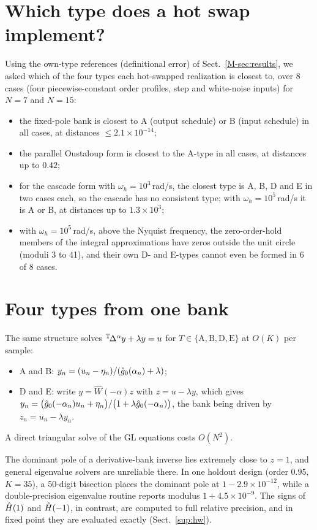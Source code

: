 \section{Which type does a hot swap implement?}\label{sup:hotswap}
Using the own-type references (definitional error) of Sect.~\ref{M-sec:results}, we asked which of the four types each hot-swapped realization is closest to, over 8 cases (four piecewise-constant order profiles, step and white-noise inputs) for $N=7$ and $N=15$:
\begin{itemize}
\item the fixed-pole bank is closest to A (output schedule) or B (input schedule) in all cases, at distances $\le2.1\times10^{-14}$;
\item the parallel Oustaloup form is closest to the A-type in all cases, at distances up to $0.42$;
\item for the cascade form with $\omega_h=10^3$\,rad/s, the closest type is A, B, D and E in two cases each, so the cascade has no consistent type; with $\omega_h=10^5$\,rad/s it is A or B, at distances up to $1.3\times10^{3}$;
\item with $\omega_h=10^5$\,rad/s, above the Nyquist frequency, the zero-order-hold members of the integral approximations have zeros outside the unit circle (moduli 3 to 41), and their own D- and E-types cannot even be formed in 6 of 8 cases.
\end{itemize}



\section{Four types from one bank}\label{sup:types}
\begin{remark}\label{rem:relax}
The same structure solves ${}^{\mathrm{T}}\!\Delta^{\alpha}y+\lambda y=u$ for $T\in\{\mathrm{A,B,D,E}\}$ at $O(K)$ per sample:
\begin{itemize}
\item A and B: $y_n=(u_n-\eta_n)/(\hat g_0(\alpha_n)+\lambda)$;
\item D and E: write $y=\hat W(-\alpha)z$ with $z=u-\lambda y$, which gives $y_n=\big(\hat g_0(-\alpha_n)u_n+\eta_n\big)/\big(1+\lambda\hat g_0(-\alpha_n)\big)$, the bank being driven by $z_n=u_n-\lambda y_n$.
\end{itemize}
A direct triangular solve of the GL equations costs $O(N^2)$.
\end{remark}
\begin{remark}\label{rem:eig}
The dominant pole of a derivative-bank inverse lies extremely close to $z=1$, and general eigenvalue solvers are unreliable there. In one holdout design (order $0.95$, $K=35$), a 50-digit bisection places the dominant pole at $1-2.9\times10^{-12}$, while a double-precision eigenvalue routine reports modulus $1+4.5\times10^{-9}$. The signs of $\hat H(1)$ and $\hat H(-1)$, in contrast, are computed to full relative precision, and in fixed point they are evaluated exactly (Sect.~\ref{sup:hw}).
\end{remark}


